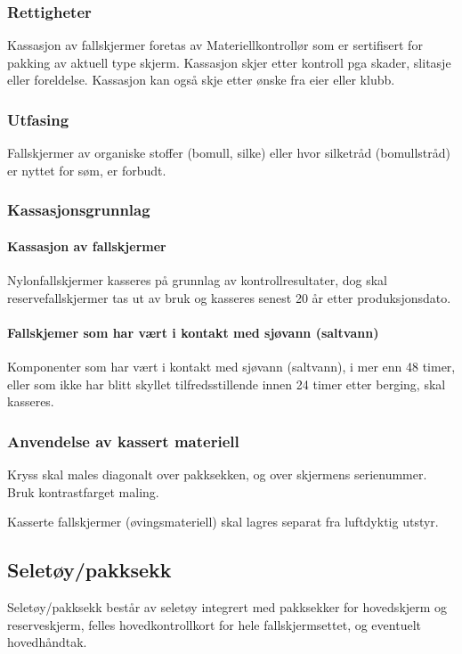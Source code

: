 \subsubsection{Rettigheter}
Kassasjon av fallskjermer foretas av Materiellkontrollør som er sertifisert for pakking av aktuell type skjerm. Kassasjon skjer etter kontroll pga skader, slitasje eller foreldelse. Kassasjon kan også skje etter ønske fra eier eller klubb.

\subsubsection{Utfasing}
Fallskjermer av organiske stoffer (bomull, silke) eller hvor silketråd (bomullstråd) er nyttet for søm, er forbudt.

\subsubsection{Kassasjonsgrunnlag}
\paragraph{Kassasjon av fallskjermer}
Nylonfallskjermer kasseres på grunnlag av kontrollresultater, dog skal reservefallskjermer tas ut av bruk og kasseres senest 20 år etter produksjonsdato.

\paragraph{Fallskjemer som har vært i kontakt med sjøvann (saltvann)}
Komponenter som har vært i kontakt med sjøvann (saltvann), i mer enn 48 timer, eller som ikke har blitt skyllet tilfredsstillende innen 24 timer etter berging, skal kasseres.

\subsubsection{Anvendelse av kassert materiell}
Kryss skal males diagonalt over pakksekken, og over skjermens serienummer. Bruk kontrastfarget maling.

Kasserte fallskjermer (øvingsmateriell) skal lagres separat fra luftdyktig utstyr.

\subsection{Seletøy/pakksekk}
Seletøy/pakksekk består av seletøy integrert med pakksekker for hovedskjerm og reserveskjerm, felles hovedkontrollkort for hele fallskjermsettet, og eventuelt hovedhåndtak.

